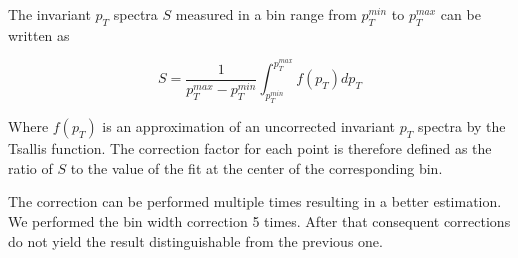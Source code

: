 The invariant $p_T$ spectra $S$ measured in a bin range from $p_T^{min}$ to $p_T^{max}$ can be written as

\begin{equation}
	S = \frac{1}{p_T^{max} - p_T^{min}} \int_{p_T^{min}}^{p_T^{max}} f(p_T) dp_T
\end{equation}

Where $f(p_T)$ is an approximation of an uncorrected invariant $p_T$ spectra by the Tsallis function. The correction factor for each point is therefore defined as the ratio of $S$ to the value of the fit at the center of the corresponding bin.

The correction can be performed multiple times resulting in a better estimation. We performed the bin width correction 5 times. After that consequent corrections do not yield the result distinguishable from the previous one.
